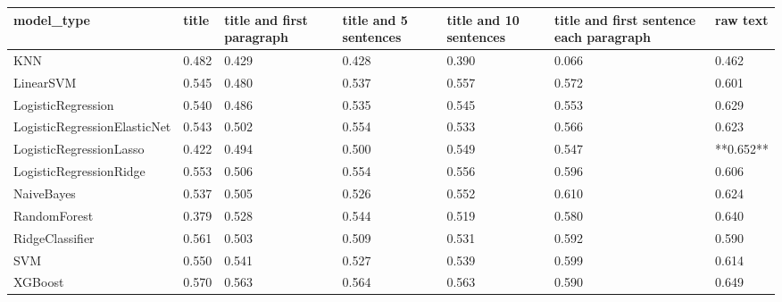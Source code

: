 \begin{tabular}{lllllll}
\toprule
                  model\_type & title & title and first paragraph & title and 5 sentences & title and 10 sentences & title and first sentence each paragraph &  raw text \\
\midrule
                         KNN & 0.482 &                     0.429 &                 0.428 &                  0.390 &                                   0.066 &     0.462 \\
                   LinearSVM & 0.545 &                     0.480 &                 0.537 &                  0.557 &                                   0.572 &     0.601 \\
          LogisticRegression & 0.540 &                     0.486 &                 0.535 &                  0.545 &                                   0.553 &     0.629 \\
LogisticRegressionElasticNet & 0.543 &                     0.502 &                 0.554 &                  0.533 &                                   0.566 &     0.623 \\
     LogisticRegressionLasso & 0.422 &                     0.494 &                 0.500 &                  0.549 &                                   0.547 & **0.652** \\
     LogisticRegressionRidge & 0.553 &                     0.506 &                 0.554 &                  0.556 &                                   0.596 &     0.606 \\
                  NaiveBayes & 0.537 &                     0.505 &                 0.526 &                  0.552 &                                   0.610 &     0.624 \\
                RandomForest & 0.379 &                     0.528 &                 0.544 &                  0.519 &                                   0.580 &     0.640 \\
             RidgeClassifier & 0.561 &                     0.503 &                 0.509 &                  0.531 &                                   0.592 &     0.590 \\
                         SVM & 0.550 &                     0.541 &                 0.527 &                  0.539 &                                   0.599 &     0.614 \\
                     XGBoost & 0.570 &                     0.563 &                 0.564 &                  0.563 &                                   0.590 &     0.649 \\
\bottomrule
\end{tabular}
